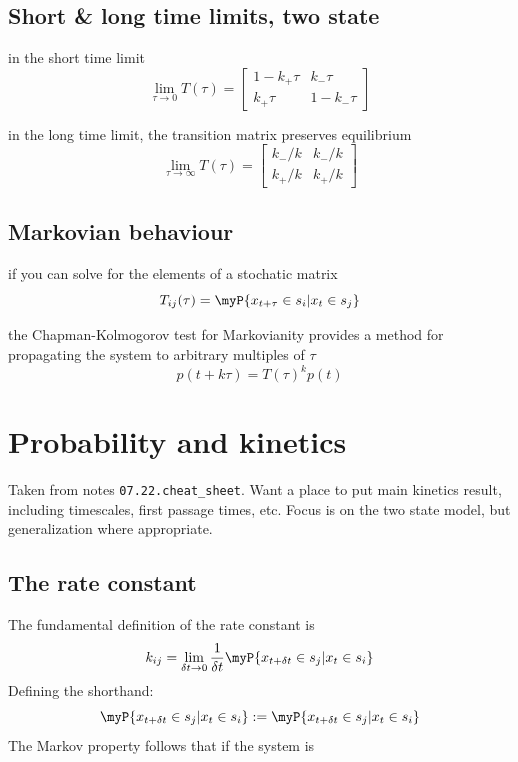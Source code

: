\documentclass[twocolumn]{notes}
\begin{document}
\subsection{Short \& long time limits, two state}
\begin{itemizec}
    \item in the short time limit
    \[
        \lim_{\tau\rightarrow 0}T(\tau) =
        \begin{bmatrix}
            1 - k_+\tau & k_-\tau \\ k_+\tau & 1 - k_-\tau
        \end{bmatrix}
    \]
    \item in the long time limit, the transition matrix preserves equilibrium
    \[
        \lim_{\tau\rightarrow \infty}T(\tau) =
        \begin{bmatrix}
            k_-/k & k_-/k \\ k_+/k & k_+/k
        \end{bmatrix}
    \]
\end{itemizec}

\subsection{Markovian behaviour}
\begin{itemizec}
    \item if you can solve for the elements of a stochatic matrix
    \[
        T_{ij}(\tau) = \myP{x_{t+\tau}\in s_i | x_t\in s_j}
    \]
    \item the Chapman-Kolmogorov test for Markovianity provides a method for propagating the system to arbitrary multiples of $\tau$
    \[
        p(t+k\tau) =  T(\tau)^k p(t)
    \]
\end{itemizec}

\section{Probability and kinetics}

Taken from notes \texttt{07.22.cheat\_sheet}.
Want a place to put main kinetics result, including timescales, first passage times, etc.  Focus is on the two state model, but generalization where appropriate.

\subsection{The rate constant}
The fundamental definition of the rate constant is
\[
    k_{ij} = \lim_{\delta t\rightarrow 0}\frac{1}{\delta t}
    \myP{x_{t+\delta t} \in s_j|x_t\in s_i}
\]
Defining the shorthand:
\[
    \myP{x_{t+\delta t} \in s_j|x_t\in s_i} := \myP{x_{t+\delta t} \in s_j|x_t\in s_i}
\]
The Markov property follows that if the system is

% 
\end{document}
